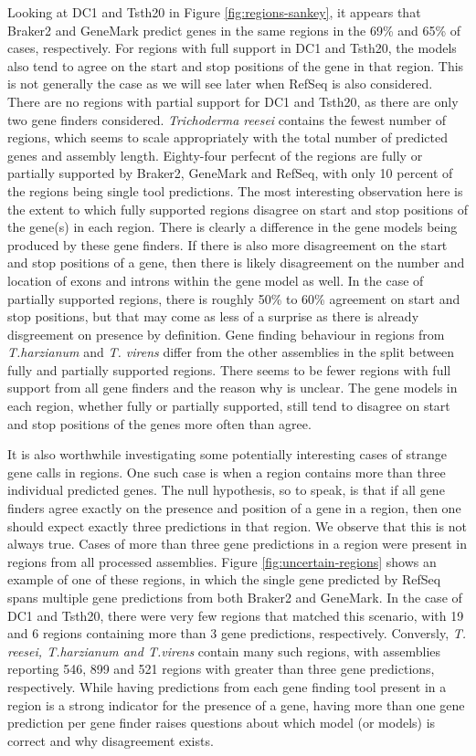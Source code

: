 Looking at DC1 and Tsth20 in Figure \ref{fig:regions-sankey}, it
appears that Braker2 and GeneMark predict genes in the same regions in
the 69\% and 65\% of cases, respectively. For regions with full
support in DC1 and Tsth20, the models also tend to agree on the start
and stop positions of the gene in that region. This is not generally
the case as we will see later when RefSeq is also considered. There
are no regions with partial support for DC1 and Tsth20, as there are
only two gene finders considered. \textit{Trichoderma reesei} contains
the fewest number of regions, which seems to scale appropriately with
the total number of predicted genes and assembly length. Eighty-four
perfecnt of the regions are fully or partially supported by Braker2,
GeneMark and RefSeq, with only 10 percent of the regions being single
tool predictions. The most interesting observation here is the extent
to which fully supported regions disagree on start and stop positions
of the gene(s) in each region. There is clearly a difference in the
gene models being produced by these gene finders. If there is also
more disagreement on the start and stop positions of a gene, then
there is likely disagreement on the number and location of exons and
introns within the gene model as well. In the case of partially
supported regions, there is roughly 50\% to 60\% agreement on start
and stop positions, but that may come as less of a surprise as there
is already disgreement on presence by definition. Gene finding
behaviour in regions from \textit{T.harzianum} and \textit{T. virens}
differ from the other assemblies in the split between fully and
partially supported regions. There seems to be fewer regions with full
support from all gene finders and the reason why is unclear. The gene
models in each region, whether fully or partially supported, still
tend to disagree on start and stop positions of the genes more often
than agree.

It is also worthwhile investigating some potentially interesting cases
of strange gene calls in regions. One such case is when a region
contains more than three individual predicted genes. The null
hypothesis, so to speak, is that if all gene finders agree exactly on
the presence and position of a gene in a region, then one should
expect exactly three predictions in that region. We observe that this
is not always true. Cases of more than three gene predictions in a
region were present in regions from all processed assemblies. Figure
\ref{fig:uncertain-regions} shows an example of one of these regions,
in which the single gene predicted by RefSeq spans multiple gene
predictions from both Braker2 and GeneMark. In the case of DC1 and
Tsth20, there were very few regions that matched this scenario, with
19 and 6 regions containing more than 3 gene predictions,
respectively. Conversly, \textit{T. reesei, T.harzianum and T.virens}
contain many such regions, with assemblies reporting 546, 899 and 521
regions with greater than three gene predictions, respectively. While
having predictions from each gene finding tool present in a region is
a strong indicator for the presence of a gene, having more than one
gene prediction per gene finder raises questions about which model (or
models) is correct and why disagreement exists.

